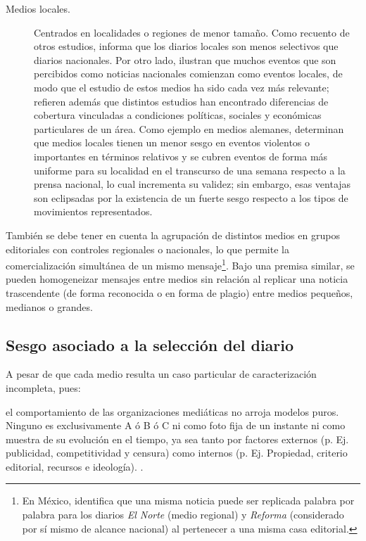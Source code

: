 \documentclass[letterpaper, 11pt]{book}
\theoremstyle{definition}
\theoremstyle{remark}
\begin{document}
\begin{description}
    \item[Medios locales.] Centrados en localidades o regiones de menor tamaño. 
    Como recuento de otros estudios, \citet{2014_Hutter_AEP} informa que los diarios locales son menos selectivos que diarios nacionales. 
    Por otro lado,  \citet{1999_OliverMyers_LocalNewspapers} ilustran que muchos eventos que son percibidos como noticias nacionales comienzan como eventos locales, de modo que el estudio de estos medios ha sido cada vez más relevante; refieren además que distintos estudios han encontrado diferencias de cobertura vinculadas a condiciones políticas, sociales y económicas particulares de un área. 
    Como ejemplo en medios alemanes, \citet{1999_BarrancoET_ValidityNewspapers} determinan que medios locales tienen un menor sesgo en eventos violentos o importantes en términos relativos y se cubren eventos de forma más uniforme para su localidad en el transcurso de una semana respecto a la prensa nacional, lo cual incrementa su validez; sin embargo, esas ventajas son eclipsadas por la existencia de un fuerte sesgo respecto a los tipos de movimientos representados.
    
\end{description}

También se debe tener en cuenta la agrupación de distintos medios en grupos editoriales con controles regionales o nacionales, lo que permite la comercialización simultánea de un mismo mensaje\footnote{En México, \citet{2005_Strawn_Tesis} identifica que una misma noticia puede ser replicada palabra por palabra para los diarios \emph{El Norte} (medio regional) y \emph{Reforma} (considerado por sí mismo de alcance nacional) al pertenecer a una misma casa editorial.}. 
Bajo una premisa similar, se pueden homogeneizar mensajes entre medios sin relación al replicar una noticia trascendente (de forma reconocida o en forma de plagio) entre medios pequeños, medianos o grandes.

 


\subsection{Sesgo asociado a la selección del diario}
\label{sec:Sesgo_periodico}

A pesar de que cada medio resulta un caso particular de caracterización incompleta, pues:

\begin{center}
    \begin{minipage}{0.9\linewidth}
        {\setlength{\parindent}{12pt}\small
          el comportamiento de las organizaciones mediáticas no arroja modelos puros. Ninguno es exclusivamente A ó B ó C ni como foto fija de un instante ni como muestra de su evolución en el tiempo, ya sea tanto por factores externos (p. Ej. publicidad, competitividad y censura) como internos (p. Ej. Propiedad, criterio editorial, recursos e ideología). \normalsize \citep[23--24]{2008_ASF_Medios}.
        }
    \end{minipage}
\end{center}
\end{document}
